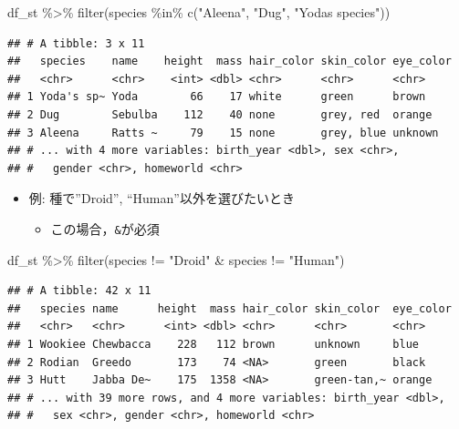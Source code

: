\documentclass[
  xelatex,ja=standard, b5paper]{bxjsbook}
\newenvironment{Shaded}{\begin{snugshade}}{\end{snugshade}}
\newcommand{\FunctionTok}[1]{\textcolor[rgb]{0.00,0.00,0.00}{#1}}
\newcommand{\NormalTok}[1]{#1}
\newcommand{\SpecialCharTok}[1]{\textcolor[rgb]{0.00,0.00,0.00}{#1}}
\newcommand{\StringTok}[1]{\textcolor[rgb]{0.31,0.60,0.02}{#1}}
\providecommand{\tightlist}{%
  \setlength{\itemsep}{0pt}\setlength{\parskip}{0pt}}
\begin{document}
\begin{Shaded}
\begin{Highlighting}[]
\NormalTok{df\_st }\SpecialCharTok{\%\textgreater{}\%} 
  \FunctionTok{filter}\NormalTok{(species }\SpecialCharTok{\%in\%} \FunctionTok{c}\NormalTok{(}\StringTok{"Aleena"}\NormalTok{, }\StringTok{"Dug"}\NormalTok{, }\StringTok{"Yoda\textquotesingle{}s species"}\NormalTok{))}
\end{Highlighting}
\end{Shaded}

\begin{verbatim}
## # A tibble: 3 x 11
##   species    name    height  mass hair_color skin_color eye_color
##   <chr>      <chr>    <int> <dbl> <chr>      <chr>      <chr>    
## 1 Yoda's sp~ Yoda        66    17 white      green      brown    
## 2 Dug        Sebulba    112    40 none       grey, red  orange   
## 3 Aleena     Ratts ~     79    15 none       grey, blue unknown  
## # ... with 4 more variables: birth_year <dbl>, sex <chr>,
## #   gender <chr>, homeworld <chr>
\end{verbatim}

\begin{itemize}
\tightlist
\item
  例: 種で''Droid'', ``Human''以外を選びたいとき

  \begin{itemize}
  \tightlist
  \item
    この場合，\texttt{\&}が必須
  \end{itemize}
\end{itemize}

\begin{Shaded}
\begin{Highlighting}[]
\NormalTok{df\_st }\SpecialCharTok{\%\textgreater{}\%} 
  \FunctionTok{filter}\NormalTok{(species }\SpecialCharTok{!=} \StringTok{"Droid"} \SpecialCharTok{\&}\NormalTok{ species }\SpecialCharTok{!=} \StringTok{"Human"}\NormalTok{)}
\end{Highlighting}
\end{Shaded}

\begin{verbatim}
## # A tibble: 42 x 11
##   species name      height  mass hair_color skin_color  eye_color
##   <chr>   <chr>      <int> <dbl> <chr>      <chr>       <chr>    
## 1 Wookiee Chewbacca    228   112 brown      unknown     blue     
## 2 Rodian  Greedo       173    74 <NA>       green       black    
## 3 Hutt    Jabba De~    175  1358 <NA>       green-tan,~ orange   
## # ... with 39 more rows, and 4 more variables: birth_year <dbl>,
## #   sex <chr>, gender <chr>, homeworld <chr>
\end{verbatim}
\end{document}
